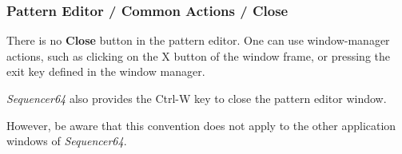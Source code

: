 \subsubsection{Pattern Editor / Common Actions / Close}
\label{subsec:seq64_pattern_editor_close}

   There is no \textbf{Close} button in the pattern editor.  One can use
   window-manager actions, such as clicking on the X button of the window
   frame, or pressing the exit key defined in the window manager.

   \textsl{Sequencer64} also provides the Ctrl-W key to close the pattern
   editor window.

   However, be aware that this convention does not apply to the other
   application windows of \textsl{Sequencer64}.

